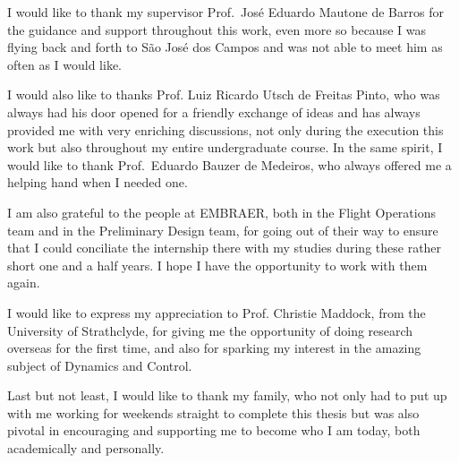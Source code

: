 \documentclass[tcc]{subfile}
\begin{document}
\begin{agradecimentos}

    I would like to thank my supervisor Prof.\ José Eduardo Mautone de Barros for
    the guidance and support throughout this work, even more so because I was
    flying back and forth to São José dos Campos and was not able to meet him as
    often as I would like.

    I would also like to thanks Prof. Luiz Ricardo Utsch de Freitas Pinto, who was
    always had his door opened for a friendly exchange of ideas and has always provided
    me with very enriching discussions, not only during the execution this work
    but also throughout my entire undergraduate course.  In the same spirit, I
    would like to thank Prof.\ Eduardo Bauzer de Medeiros, who always offered
    me a helping hand when I needed one.

    I am also grateful to the people at EMBRAER, both in the Flight Operations
    team and in the Preliminary Design team, for going out of their
    way to ensure that I could conciliate the internship there with my studies
    during these rather short one and a half years. I
    hope I have the opportunity to work with them again.

    I would like to express my appreciation to Prof. Christie Maddock, from the
    University of Strathclyde, for giving me the opportunity of doing research overseas for the first time,
    and also for sparking my interest in the amazing subject of Dynamics and Control.

    Last but not least, I would like to thank my family, who not only had to put up
    with me working for weekends straight to complete this thesis but was also
    pivotal in encouraging and supporting me to become who I am today, both
    academically and personally. 

\end{agradecimentos}
\end{document}
